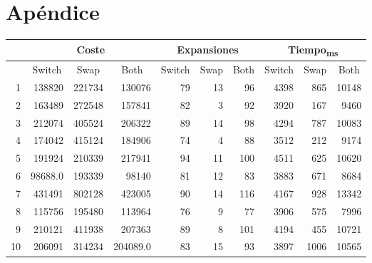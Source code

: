 \documentclass{article}
\begin{document}
\newpage
\section{Apéndice}
  \begin{center}
    \begin{tabular}{ | r | r | r | r | r | r | r | r | r | r | }
      \hline
      \rowcolor{DarkGrey}
      & \multicolumn{3}{|c|}{Coste} & \multicolumn{3}{c|}{Expansiones} & \multicolumn{3}{|c|}{Tiempo\textsubscript{ms}} \\ \hline
      \rowcolor{DarkGrey}
      \multicolumn{1}{|c|}{Réplica} & \multicolumn{1}{|c|}{Switch} & \multicolumn{1}{|c|}{Swap} & \multicolumn{1}{|c|}{Both} & \multicolumn{1}{|c|}{Switch} & \multicolumn{1}{|c|}{Swap} & \multicolumn{1}{|c|}{Both} & \multicolumn{1}{|c|}{Switch} & \multicolumn{1}{|c|}{Swap} & \multicolumn{1}{|c|}{Both} \\ \hline \hline
      1 & 138820 & 221734 & 130076 & 79 & 13 & 96 & 4398 & 865 & 10148 \\ \hline
      \rowcolor{LightGrey}
      2 & 163489 & 272548 & 157841 & 82 & 3 & 92 & 3920 & 167 & 9460 \\ \hline
      3 & 212074 & 405524 & 206322 & 89 & 14 & 98 & 4294 & 787 & 10083 \\ \hline
      \rowcolor{LightGrey}
      4 & 174042 & 415124 & 184906 & 74 & 4 & 88 & 3512 & 212 & 9174 \\ \hline
      5 & 191924 & 210339 & 217941 & 94 & 11 & 100 & 4511 & 625 & 10620 \\ \hline
      \rowcolor{LightGrey}
      6 & 98688.0 & 193339 & 98140 & 81 & 12 & 83 & 3883 & 671 & 8684 \\ \hline
      7 & 431491 & 802128 & 423005 & 90 & 14 & 116 & 4167 & 928 & 13342 \\ \hline
      \rowcolor{LightGrey}
      8 & 115756 & 195480 & 113964 & 76 & 9 & 77 & 3906 & 575 & 7996 \\ \hline
      9 & 210121 & 411938 & 207363 & 89 & 8 & 101 & 4194 & 455 & 10721 \\ \hline
      \rowcolor{LightGrey}
      10 & 206091 & 314234 & 204089.0 & 83 & 15 & 93 & 3897 & 1006 & 10565 \\ \hline
    \end{tabular}
    \label{table:T1}
  \end{center}
\end{document}
